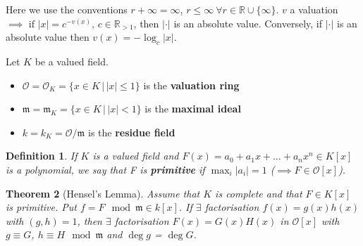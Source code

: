 \documentclass[a4paper]{article}
\newtheorem{definition}{Definition}
\newtheorem{theorem}[definition]{Theorem}
\newcommand*\abs[1]{\left|#1\right|}
\begin{document}
Here we use the conventions $r+\infty = \infty$, $r \leq \infty\ \forall r \in \mathbb{R} \cup \{\infty\}$. $v$ a valuation $\implies \text{ if } \abs{x} = c^{-v(x)},\, c \in \mathbb{R}_{>1}$, then $\abs{\cdot}$ is an absolute value. Conversely, if $\abs{\cdot}$ is an absolute value then $v(x)=-\log_c\abs{x}$.

Let $K$ be a valued field.
\begin{itemize}
	\item $\mathcal{O} = \mathcal{O}_K = \{x \in K \,|\, \abs{x} \leq 1\}$ is the \textbf{valuation ring}
	\item $\mathfrak{m} = \mathfrak{m}_K = \{x \in K \,|\, \abs{x} < 1\}$ is the \textbf{maximal ideal}
	\item $k = k_K = \mathcal{O}/\mathfrak{m}$ is the \textbf{residue field}
\end{itemize}

\begin{definition}
	If $K$ is a valued field and $F(x)=a_0 + a_1 x + \dots + a_n x^n \in K[x]$ is a polynomial, we say that F is \textbf{primitive} if $\max_i \abs{a_i} = 1$ ($\implies F \in \mathcal{O}[x]$).
\end{definition}

\begin{theorem}[Hensel's Lemma]
	Assume that $K$ is complete and that $F \in K[x]$ is primitive. Put $f = F \mod \mathfrak{m} \in k[x]$. If $\exists$ factorisation $f(x)=g(x)h(x)$ with $(g,h)=1$, then $\exists$ factorisation $F(x)=G(x)H(x)$ in $\mathcal{O}[x]$ with $g \equiv G$, $h \equiv H \mod \mathfrak{m}$ and $\deg g$ = $\deg G$.
\end{theorem}
\end{document}
